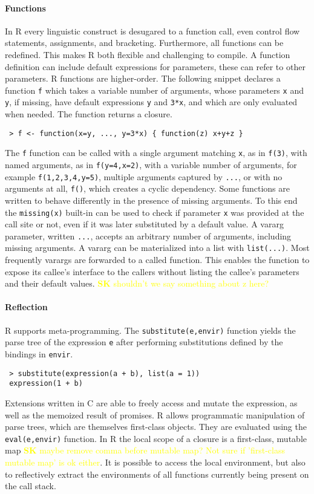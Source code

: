 \documentclass[review,creen,acmsmall]{acmart}
\newcommand{\authorcomment}[3]{\xspace\textcolor{#1}{{\bf #2} #3}\xspace}
\newcommand{\SK}[1]{\authorcomment{yellow}{SK}{#1}}
\newcommand{\code}[1]{\lstinline |#1|\xspace}
\renewcommand{\c}[1]{\lstinline |#1|\xspace}
\begin{document}
\paragraph{Functions}
In R every linguistic construct is desugared to a function call, even control
flow statements, assignments, and bracketing. Furthermore, all functions can be
redefined. This makes R both flexible and challenging to compile. A function
definition can include default expressions for parameters, these can refer to
other parameters. R functions are higher-order. The following snippet declares a
function \code f which takes a variable number of arguments, whose parameters
\code x and \code y, if missing, have default expressions \code y and
\code{3*x}, and which are only evaluated when needed. The function returns a closure.
\begin{lstlisting}
 > f <- function(x=y, ..., y=3*x) { function(z) x+y+z }
\end{lstlisting}\vspace{1mm}
\noindent
The \code f function can be called with a single argument matching \code x, as in
\code{f(3)}, with named arguments, as in \code{f(y=4,x=2)}, with a variable
number of arguments, for example \code{f(1,2,3,4,y=5)}, multiple arguments
captured by \code{...}, or with no arguments at all, \code{f()}, which creates a
cyclic dependency. Some functions are written to behave differently in the
presence of missing arguments. To this end the \c{missing(x)} built-in can be
used to check if parameter \code{x} was provided at the call site or not, even
if it was later substituted by a default value. A vararg parameter, written
\code{...}, accepts an arbitrary number of arguments, including missing
arguments. A vararg can be materialized into a list with \code{list(...)}. Most
frequently varargs are forwarded to a called function. This enables the
function to expose its callee's interface to the callers without listing the
callee's parameters and their default values. \SK{shouldn't we say something about z here?}

\paragraph{Reflection}
R supports meta-programming. The \code{substitute(e,envir)}
function yields the parse tree of the expression \code{e} after performing
substitutions defined by the bindings in \code{envir}.
\vspace{-1mm}
\begin{lstlisting}
 > substitute(expression(a + b), list(a = 1))
 expression(1 + b)
\end{lstlisting}
\noindent
Extensions written in C are able to freely access and mutate the expression, as
well as the memoized result of promises. R allows programmatic manipulation of
parse trees, which are themselves first-class objects. They are evaluated using
the \code{eval(e,envir)} function. In R the local scope of a closure is a
first-class, mutable map \SK{maybe remove comma before mutable map? Not sure if 'first-class mutable map' is ok either}. It is possible to access the local environment, but
also to reflectively extract the environments of all functions currently being
present on the call stack.
\end{document}
